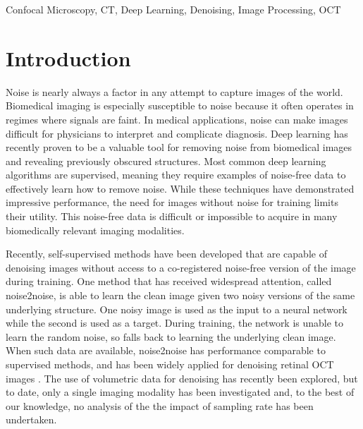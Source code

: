 \documentclass[journal,twoside,web]{ieeecolor}
\begin{document}
\begin{IEEEkeywords}
Confocal Microscopy, CT, Deep Learning, Denoising, Image Processing, OCT
\end{IEEEkeywords}


\section{Introduction}
Noise is nearly always a factor in any attempt to capture images of the world. Biomedical imaging is especially susceptible to noise because it often operates in regimes where signals are faint. In medical applications, noise can make images difficult for physicians to interpret and complicate diagnosis. Deep learning has recently proven to be a valuable tool for removing noise from biomedical images and revealing previously obscured structures\cite{Kaur2017}. Most common deep learning algorithms are supervised, meaning they require examples of noise-free data to effectively learn how to remove noise. While these techniques have demonstrated impressive performance, the need for images without noise for training limits their utility. This noise-free data is difficult or impossible to acquire in many biomedically relevant imaging modalities.

Recently, self-supervised methods have been developed that are capable of denoising images without access to a co-registered noise-free version of the image during training. One method that has received widespread attention, called noise2noise, is able to learn the clean image given two noisy versions of the same underlying structure\cite{Lehtinen2018a}. One noisy image is used as the input to a neural network while the second is used as a target. During training, the network is unable to learn the random noise, so falls back to learning the underlying clean image. When such data are available, noise2noise has performance comparable to supervised methods, and has been widely applied for denoising retinal OCT images \cite{Huang2021,Huang2021a,Mao2019,Qiu2021}. The use of volumetric data for denoising has recently been explored\cite{Papkov2021}, but to date, only a single imaging modality has been investigated and, to the best of our knowledge, no analysis of the the impact of sampling rate has been undertaken.
\end{document}
